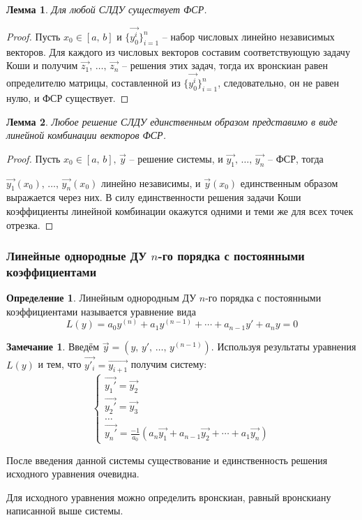 \documentclass[a4paper,12pt]{article}
\theoremstyle{plain}
\newtheorem{lemma}{Лемма}[section]
\theoremstyle{definition}
\newtheorem{definition}{Определение}[section]
\newtheorem*{note}{Замечание}
\theoremstyle{remark}
\begin{document}
\begin{lemma}
	Для любой СЛДУ существует ФСР.
\end{lemma}

\begin{proof}
	Пусть $x_0 \in [a,\,b]$ и $\{\vec{y_0^i}\}_{i = 1}^n$ -- набор числовых линейно независимых векторов. Для каждого из числовых векторов составим соответствующую задачу Коши и получим $\vec{z_1},\,\ldots,\,\vec{z_n}$ -- решения этих задач, тогда их вронскиан равен определителю матрицы, составленной из $\{\vec{y_0^i}\}_{i = 1}^n$, следовательно, он не равен нулю, и ФСР существует.
\end{proof}

\begin{lemma}
	Любое решение СЛДУ единственным образом представимо в виде линейной комбинации векторов ФСР.
\end{lemma}

\begin{proof}
	Пусть $x_0 \in [a,\,b],\, \vec{y}$ -- решение системы, и $\vec{y_1},\,\ldots,\,\vec{y_n}$ -- ФСР, тогда

	$\vec{y_1}(x_0),\,\ldots,\,\vec{y_n}(x_0)$ линейно независимы, и $\vec{y}(x_0)$ единственным образом выражается через них. В силу единственности решения задачи Коши коэффициенты линейной комбинации окажутся одними и теми же для всех точек отрезка.
\end{proof}

\subsubsection*{Линейные однородные ДУ $n$-го порядка с постоянными коэффициентами}
\begin{definition}
	Линейным однородным ДУ $n$-го порядка с постоянными коэффициентами называется уравнение вида
	\[L(y) = a_0y^{(n)} + a_1y^{(n - 1)} + \cdots + a_{n - 1}y' + a_ny = 0\]
\end{definition}

\begin{note}
	Введём $\vec{y} = (y,\, y',\,\ldots,\,y^{(n-1)})$. Используя результаты уравнения $L(y)$ и тем, что $\vec{y'_i} = \vec{y_{i+1}}$ получим систему:
	\[\begin{cases}
			\vec{y_1'} = \vec{y_2} \\
			\vec{y_2'} = \vec{y_3} \\
			\ldots                 \\
			\vec{y_n'} = \frac{-1}{a_0}(a_n\vec{y_1} + a_{n-1}\vec{y_2} + \cdots + a_1\vec{y_n})
		\end{cases}\]

	После введения данной системы существование и единственность решения исходного уравнения очевидна.

	Для исходного уравнения можно определить вронскиан, равный вронскиану написанной выше системы.
\end{note}
\end{document}
